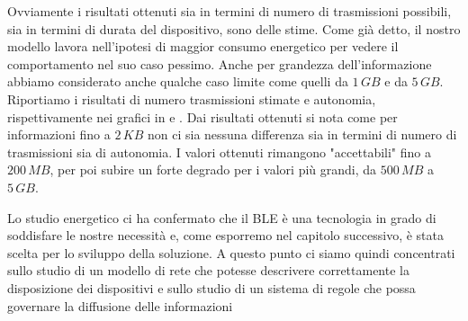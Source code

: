 Ovviamente i risultati ottenuti sia in termini di numero di trasmissioni possibili, sia in termini di durata del dispositivo, sono delle stime. Come già detto, il nostro modello lavora nell'ipotesi di maggior consumo energetico per vedere il comportamento nel suo caso pessimo. Anche per grandezza dell'informazione abbiamo considerato anche qualche caso limite come quelli da $1\,GB$ e da $5\,GB$. Riportiamo i risultati di numero trasmissioni stimate e autonomia, rispettivamente nei grafici in  e . Dai risultati ottenuti si nota come per informazioni fino a $2\,KB$ non ci sia nessuna differenza sia in termini di numero di trasmissioni sia di autonomia. I valori ottenuti rimangono "accettabili" fino a $200\,MB$, per poi subire un forte degrado per i valori più grandi, da $500\,MB$ a $5\,GB$.

Lo studio energetico ci ha confermato che il \acs{BLE} è una tecnologia in grado di soddisfare le nostre necessità e, come esporremo nel capitolo successivo, è stata scelta per lo sviluppo della soluzione. A questo punto ci siamo quindi concentrati sullo studio di un modello di rete che potesse descrivere correttamente la disposizione dei dispositivi e sullo studio di un sistema di regole che possa governare la diffusione delle informazioni

